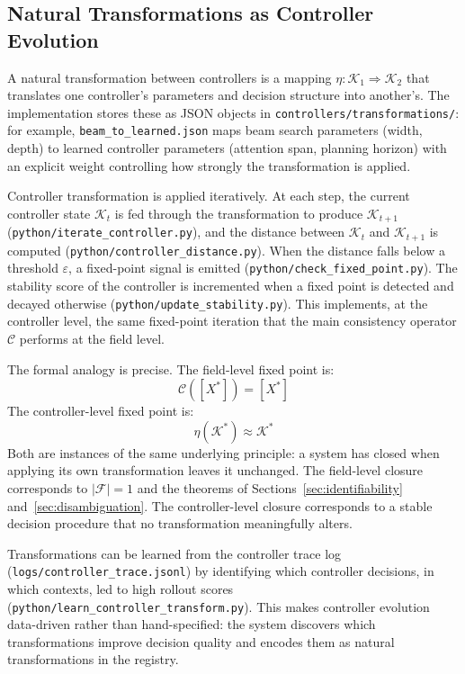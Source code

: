 \documentclass[12pt, oneside]{article}
\begin{document}
\subsection{Natural Transformations as Controller Evolution}

A natural transformation between controllers is a mapping
$\eta : \mathcal{K}_1 \Rightarrow \mathcal{K}_2$ that translates one controller's
parameters and decision structure into another's. The implementation stores these as
JSON objects in \texttt{controllers/transformations/}: for example,
\texttt{beam\_to\_learned.json} maps beam search parameters (width, depth) to learned
controller parameters (attention span, planning horizon) with an explicit weight
controlling how strongly the transformation is applied.

Controller transformation is applied iteratively. At each step, the current controller
state $\mathcal{K}_t$ is fed through the transformation to produce $\mathcal{K}_{t+1}$
(\texttt{python/iterate\_controller.py}), and the distance between $\mathcal{K}_t$ and
$\mathcal{K}_{t+1}$ is computed (\texttt{python/controller\_distance.py}). When the
distance falls below a threshold $\varepsilon$, a fixed-point signal is emitted
(\texttt{python/check\_fixed\_point.py}). The stability score of the controller is
incremented when a fixed point is detected and decayed otherwise
(\texttt{python/update\_stability.py}). This implements, at the controller level, the
same fixed-point iteration that the main consistency operator $\mathcal{C}$ performs at
the field level.

The formal analogy is precise. The field-level fixed point is:
\[
\mathcal{C}([X^*]) = [X^*]
\]
The controller-level fixed point is:
\[
\eta(\mathcal{K}^*) \approx \mathcal{K}^*
\]
Both are instances of the same underlying principle: a system has closed when applying
its own transformation leaves it unchanged. The field-level closure corresponds to
$|\mathcal{F}| = 1$ and the theorems of Sections~\ref{sec:identifiability}
and~\ref{sec:disambiguation}. The controller-level closure corresponds to a stable
decision procedure that no transformation meaningfully alters.

Transformations can be learned from the controller trace log
(\texttt{logs/controller\_trace.jsonl}) by identifying which controller decisions, in
which contexts, led to high rollout scores (\texttt{python/learn\_controller\_transform.py}).
This makes controller evolution data-driven rather than hand-specified: the system
discovers which transformations improve decision quality and encodes them as natural
transformations in the registry.
\end{document}
